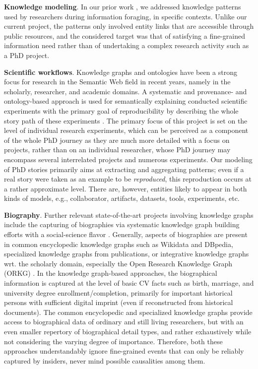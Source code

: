 \documentclass[sigconf]{acmart}
\begin{document}
\medskip
\noindent \textbf{Knowledge modeling}.
In our prior work \cite{DBLP:conf/ekaw/NguyenSRC20}, we addressed knowledge patterns used by researchers during information foraging, in specific contexts. Unlike our current project, the patterns only involved entity links that are accessible through public resources, and the considered target was that of satisfying a fine-grained information need rather than of undertaking a complex research activity such as a PhD project.

\medskip
\noindent \textbf{Scientific workflows}.
Knowledge graphs and ontologies have been a strong focus for research in the Semantic Web field in recent years, namely in the scholarly, researcher, and academic domains. 
A systematic and provenance- and ontology-based approach is used for semantically explaining conducted scientific experiments with the primary goal of reproducibility by describing the whole story path of these experiments \cite{samuelsheeba}. %
The primary focus of this project is set on the level of individual research experiments, which can be perceived as a component of the whole PhD journey as they are much more detailed with a focus on projects, rather than on an individual researcher, whose PhD journey may encompass several interrelated projects and numerous experiments. Our modeling of PhD stories primarily aims at extracting and aggregating patterns; even if a real story were taken as an example to be \textit{reproduced}, this reproduction occurs at a rather approximate level. There are, however, entities likely to appear in both kinds of models, e.g., collaborator, artifacts, datasets, tools, experiments, etc.

\medskip
\noindent \textbf{Biography}.
Further relevant state-of-the-art projects involving knowledge graphs include the capturing of biographies via systematic knowledge graph building efforts with a social-science flavor \cite{riechert2010} \cite{hyvonen2018}. 
Generally, aspects of biographies are present in common encyclopedic knowledge graphs such as Wikidata and DBpedia, specialized knowledge graphs from publications, or integrative knowledge graphs wrt. the scholarly domain, especially the Open Research Knowledge Graph (ORKG) \cite{DBLP:conf/kcap/JaradehOFPDKSA19}. In the knowledge graph-based approaches, the biographical information is captured at the level of basic CV facts such as birth, marriage, and university degree enrollment/completion, primarily for important historical persons with sufficient digital imprint (even if reconstructed from historical documents). The common encyclopedic and specialized knowledge graphs provide access to biographical data of ordinary and still living researchers, but with an even smaller repertory of biographical detail types, and rather exhaustively while not considering the varying degree of importance. Therefore, both these approaches understandably ignore fine-grained events %
that can only be reliably captured by insiders, never mind possible causalities among them. 
\end{document}
